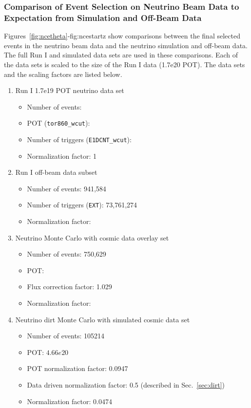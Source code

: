   \subsubsection{Comparison of Event Selection on Neutrino Beam Data to
  Expectation from Simulation and Off-Beam Data}\label{sec:datamcevent}
    Figures~\ref{fig:ncetheta}-{fig:ncestartz} show comparisons between the
    final selected events in the neutrino beam data and the neutrino simulation
    and off-beam data. The full Run I and simulated data sets are used in these
    comparisons. Each of the data sets is scaled to the size of the Run I data
    (1.7e20 POT). The data sets and the scaling factors are listed below.
    \begin{enumerate}
      \item Run I 1.7e19 POT neutrino data set
      \begin{itemize}
        \item Number of events: 
        \item POT (\texttt{tor860\_wcut}): 
        \item Number of triggers (\texttt{E1DCNT\_wcut}):
        \item Normalization factor: 1
      \end{itemize}
      \item Run I off-beam data subset
      \begin{itemize}
        \item Number of events: 941,584
        \item Number of triggers (\texttt{EXT}): 73,761,274
        \item Normalization factor: 
      \end{itemize}
      \item Neutrino Monte Carlo with cosmic data overlay set
      \begin{itemize}
        \item Number of events: 750,629
        \item POT: 
        \item Flux correction factor: 1.029
        \item Normalization factor: 
      \end{itemize}
    \item Neutrino dirt Monte Carlo with simulated cosmic data set
      \begin{itemize}
        \item Number of events: 105214
        \item POT: $4.66e20$
        \item POT normalization factor: 0.0947
        \item Data driven normalization factor: 0.5 (described in Sec.~\ref{sec:dirt})
        \item Normalization factor: 0.0474
      \end{itemize}
    \end{enumerate}

